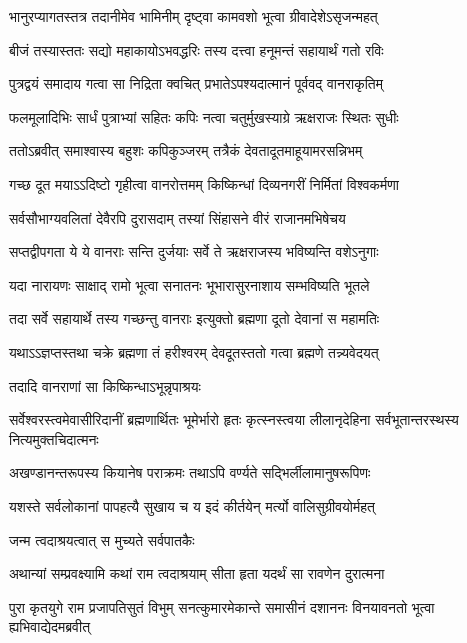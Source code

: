 \twolineshloka
{भानुरप्यागतस्तत्र तदानीमेव भामिनीम्}
{दृष्ट्वा कामवशो भूत्वा ग्रीवादेशेऽसृजन्महत्} %

\twolineshloka
{बीजं तस्यास्ततः सद्यो महाकायोऽभवद्धरिः}
{तस्य दत्त्वा हनूमन्तं सहायार्थं गतो रविः} %

\twolineshloka
{पुत्रद्वयं समादाय गत्वा सा निद्रिता क्वचित्}
{प्रभातेऽपश्यदात्मानं पूर्ववद् वानराकृतिम्} %

\twolineshloka
{फलमूलादिभिः सार्धं पुत्राभ्यां सहितः कपिः}
{नत्वा चतुर्मुखस्याग्रे ऋक्षराजः स्थितः सुधीः} %

\twolineshloka
{ततोऽब्रवीत् समाश्वास्य बहुशः कपिकुञ्जरम्}
{तत्रैकं देवतादूतमाहूयामरसन्निभम्} %

\twolineshloka
{गच्छ दूत मयाऽऽदिष्टो गृहीत्वा वानरोत्तमम्}
{किष्किन्धां दिव्यनगरीं निर्मितां विश्वकर्मणा} %

\twolineshloka
{सर्वसौभाग्यवलितां देवैरपि दुरासदाम्}
{तस्यां सिंहासने वीरं राजानमभिषेचय} %

\twolineshloka
{सप्तद्वीपगता ये ये वानराः सन्ति दुर्जयाः}
{सर्वे ते ऋक्षराजस्य भविष्यन्ति वशेऽनुगाः} %

\twolineshloka
{यदा नारायणः साक्षाद् रामो भूत्वा सनातनः}
{भूभारासुरनाशाय सम्भविष्यति भूतले} %

\twolineshloka
{तदा सर्वे सहायार्थे तस्य गच्छन्तु वानराः}
{इत्युक्तो ब्रह्मणा दूतो देवानां स महामतिः} %

\twolineshloka
{यथाऽऽज्ञप्तस्तथा चक्रे ब्रह्मणा तं हरीश्वरम्}
{देवदूतस्ततो गत्वा ब्रह्मणे तन्न्यवेदयत्} %

\onelineshloka
{तदादि वानराणां सा किष्किन्धाऽभून्नृपाश्रयः} %

\threelineshloka
{सर्वेश्वरस्त्वमेवासीरिदानीं ब्रह्मणार्थितः}
{भूमेर्भारो हृतः कृत्स्नस्त्वया लीलानृदेहिना}
{सर्वभूतान्तरस्थस्य नित्यमुक्तचिदात्मनः} %

\twolineshloka
{अखण्डानन्तरूपस्य कियानेष पराक्रमः}
{तथाऽपि वर्ण्यते सद्भिर्लीलामानुषरूपिणः} %

\twolineshloka
{यशस्ते सर्वलोकानां पापहत्यै सुखाय च}
{य इदं कीर्तयेन् मर्त्यो वालिसुग्रीवयोर्महत्} %

\onelineshloka
{जन्म त्वदाश्रयत्वात् स मुच्यते सर्वपातकैः} %

\twolineshloka
{अथान्यां सम्प्रवक्ष्यामि कथां राम त्वदाश्रयाम्}
{सीता हृता यदर्थं सा रावणेन दुरात्मना} %

\threelineshloka
{पुरा कृतयुगे राम प्रजापतिसुतं विभुम्}
{सनत्कुमारमेकान्ते समासीनं दशाननः}
{विनयावनतो भूत्वा ह्यभिवाद्येदमब्रवीत्} %

